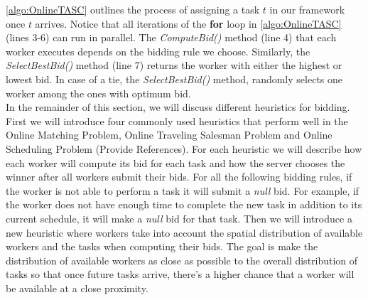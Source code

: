 \cref{algo:OnlineTASC} outlines the process of assigning a task $t$ in our framework once $t$ arrives. Notice that all iterations of the \textbf{for} loop in \cref{algo:OnlineTASC} (lines 3-6) can run in parallel. The \emph{ComputeBid()} method (line 4) that each worker executes depends on the bidding rule we choose. Similarly, the \emph{SelectBestBid()} method (line 7) returns the worker with either the highest or lowest bid. In case of a tie, the \emph{SelectBestBid()} method, randomly selects one worker among the ones with optimum bid.\\

In the remainder of this section, we will discuss different heuristics for bidding. First we will introduce four commonly used heuristics that perform well in the Online Matching Problem, Online Traveling Salesman Problem and Online Scheduling Problem (Provide References). For each heuristic we will describe how each worker will compute its bid for each task and how the server chooses the winner after all workers submit their bids. For all the following bidding rules, if the worker is not able to perform a task it will submit a \textit{null} bid. For example, if the worker does not have enough time to complete the new task in addition to its current schedule, it will make a \textit{null} bid for that task. Then we will introduce a new heuristic where workers take into account the spatial distribution of available workers and the tasks when computing their bids. The goal is make the distribution of available workers as close as possible to the overall distribution of tasks so that once future tasks arrive, there's a higher chance that a worker will be available at a close proximity.

